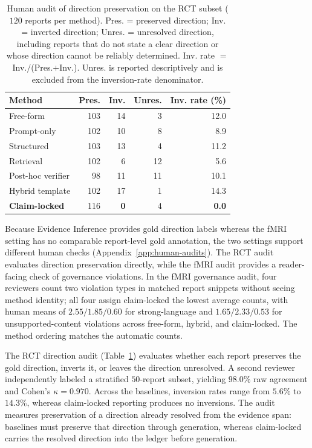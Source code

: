 \documentclass[10pt,twocolumn]{article}
\begin{document}
\begin{table}[t]
	\caption{Human audit of direction preservation on the RCT subset ($120$ reports per method). Pres. = preserved direction; Inv. = inverted direction; Unres. = unresolved direction, including reports that do not state a clear direction or whose direction cannot be reliably determined. Inv. rate $=$ Inv.$/$(Pres.$+$Inv.). Unres. is reported descriptively and is excluded from the inversion-rate denominator.}
	\label{tab:dir}
	\centering
	\footnotesize
	\setlength{\tabcolsep}{3pt}
	\begin{tabular}{lrrrr}
		\toprule
		Method & Pres. & Inv. & Unres. & Inv. rate (\%) \\
		\midrule
		Free-form             & 103 & 14 & 3  & 12.0 \\
		Prompt-only           & 102 & 10 & 8  & 8.9 \\
		Structured            & 103 & 13 & 4  & 11.2 \\
		Retrieval             & 102 & 6  & 12 & 5.6 \\
		Post-hoc verifier     & 98  & 11 & 11 & 10.1 \\
		Hybrid template       & 102 & 17 & 1  & 14.3 \\
		\textbf{Claim-locked} & 116 & \textbf{0}  & 4  & \textbf{0.0} \\
		\bottomrule
	\end{tabular}
\end{table}

Because Evidence Inference provides gold direction labels whereas the fMRI setting has no comparable report-level gold annotation, the two settings support different human checks (Appendix~\ref{app:human-audits}). The RCT audit evaluates direction preservation directly, while the fMRI audit provides a reader-facing check of governance violations. In the fMRI governance audit, four reviewers count two violation types in matched report snippets without seeing method identity; all four assign claim-locked the lowest average counts, with human means of $2.55/1.85/0.60$ for strong-language and $1.65/2.33/0.53$ for unsupported-content violations across free-form, hybrid, and claim-locked. The method ordering matches the automatic counts.

The RCT direction audit (Table~\ref{tab:dir}) evaluates whether each report preserves the gold direction, inverts it, or leaves the direction unresolved. A second reviewer independently labeled a stratified $50$-report subset, yielding $98.0\%$ raw agreement and Cohen's $\kappa=0.970$. Across the baselines, inversion rates range from $5.6\%$ to $14.3\%$, whereas claim-locked reporting produces no inversions. The audit measures preservation of a direction already resolved from the evidence span: baselines must preserve that direction through generation, whereas claim-locked carries the resolved direction into the ledger before generation.
\end{document}
